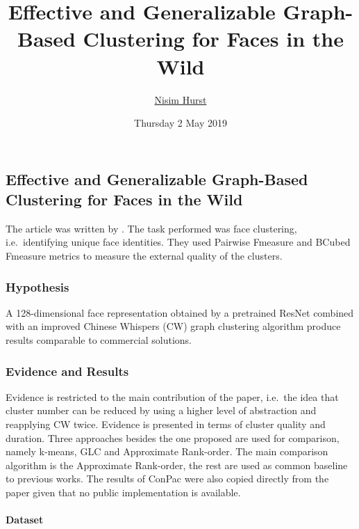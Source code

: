\documentclass[]{article}
\title{Effective and Generalizable Graph-Based Clustering for Faces in the Wild}
\author{\href{mailto:langheran@gmail.com}{Nisim Hurst}}
\date{Thursday 2 May 2019}
\let\oldparagraph\paragraph
\renewcommand{\paragraph}[1]{\oldparagraph{#1}\mbox{}}
\begin{document}
\maketitle

\label{toc}

\hypertarget{effective-and-generalizable-graph-based-clustering-for-faces-in-the-wild}{%
\subsection{Effective and Generalizable Graph-Based Clustering for Faces in the Wild}\label{effective-and-generalizable-graph-based-clustering-for-faces-in-the-wild}}

The article was written by \autocite{leonardochang2018}. The task performed was face clustering, i.e.~identifying unique face identities. They used Pairwise Fmeasure and BCubed Fmeasure metrics to measure the external quality of the clusters.

\hypertarget{hypothesis}{%
\subsubsection{Hypothesis}\label{hypothesis}}

A 128-dimensional face representation obtained by a pretrained ResNet combined with an improved Chinese Whispers (CW) graph clustering algorithm produce results comparable to commercial solutions.

\hypertarget{evidence-and-results}{%
\subsubsection{Evidence and Results}\label{evidence-and-results}}

Evidence is restricted to the main contribution of the paper, i.e.~the idea that cluster number can be reduced by using a higher level of abstraction and reapplying CW twice. Evidence is presented in terms of cluster quality and duration. Three approaches besides the one proposed are used for comparison, namely k-means, GLC and Approximate Rank-order. The main comparison algorithm is the Approximate Rank-order, the rest are used as common baseline to previous works. The results of ConPac were also copied directly from the paper given that no public implementation is available.

\hypertarget{dataset}{%
\paragraph{Dataset}\label{dataset}}
\end{document}
